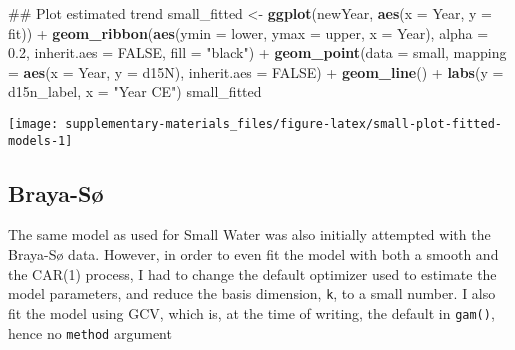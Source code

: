\documentclass[12pt,]{article}
\newenvironment{Shaded}{\begin{snugshade}}{\end{snugshade}}
\newcommand{\KeywordTok}[1]{\textcolor[rgb]{0.13,0.29,0.53}{\textbf{{#1}}}}
\newcommand{\DataTypeTok}[1]{\textcolor[rgb]{0.13,0.29,0.53}{{#1}}}
\newcommand{\FloatTok}[1]{\textcolor[rgb]{0.00,0.00,0.81}{{#1}}}
\newcommand{\StringTok}[1]{\textcolor[rgb]{0.31,0.60,0.02}{{#1}}}
\newcommand{\OtherTok}[1]{\textcolor[rgb]{0.56,0.35,0.01}{{#1}}}
\newcommand{\NormalTok}[1]{{#1}}
\begin{document}
\begin{Shaded}
\begin{Highlighting}[]
\NormalTok{## Plot estimated trend}
\NormalTok{small_fitted <-}\StringTok{ }\KeywordTok{ggplot}\NormalTok{(newYear, }\KeywordTok{aes}\NormalTok{(}\DataTypeTok{x =} \NormalTok{Year, }\DataTypeTok{y =} \NormalTok{fit)) +}
\StringTok{    }\KeywordTok{geom_ribbon}\NormalTok{(}\KeywordTok{aes}\NormalTok{(}\DataTypeTok{ymin =} \NormalTok{lower, }\DataTypeTok{ymax =} \NormalTok{upper, }\DataTypeTok{x =} \NormalTok{Year), }\DataTypeTok{alpha =} \FloatTok{0.2}\NormalTok{,}
                \DataTypeTok{inherit.aes =} \OtherTok{FALSE}\NormalTok{, }\DataTypeTok{fill =} \StringTok{"black"}\NormalTok{) +}
\StringTok{    }\KeywordTok{geom_point}\NormalTok{(}\DataTypeTok{data =} \NormalTok{small, }\DataTypeTok{mapping =} \KeywordTok{aes}\NormalTok{(}\DataTypeTok{x =} \NormalTok{Year, }\DataTypeTok{y =} \NormalTok{d15N),}
               \DataTypeTok{inherit.aes =} \OtherTok{FALSE}\NormalTok{) +}
\StringTok{    }\KeywordTok{geom_line}\NormalTok{() +}
\StringTok{    }\KeywordTok{labs}\NormalTok{(}\DataTypeTok{y =} \NormalTok{d15n_label, }\DataTypeTok{x =} \StringTok{"Year CE"}\NormalTok{)}
\NormalTok{small_fitted}
\end{Highlighting}
\end{Shaded}

\begin{center}\texttt{[image: supplementary-materials\_files/figure-latex/small-plot-fitted-models-1]} \end{center}

\subsection{Braya-Sø}\label{braya-s}

The same model as used for Small Water was also initially attempted with
the Braya-Sø data. However, in order to even fit the model with both a
smooth and the CAR(1) process, I had to change the default optimizer
used to estimate the model parameters, and reduce the basis dimension,
\texttt{k}, to a small number. I also fit the model using GCV, which is,
at the time of writing, the default in \texttt{gam()}, hence no
\texttt{method} argument
\end{document}
